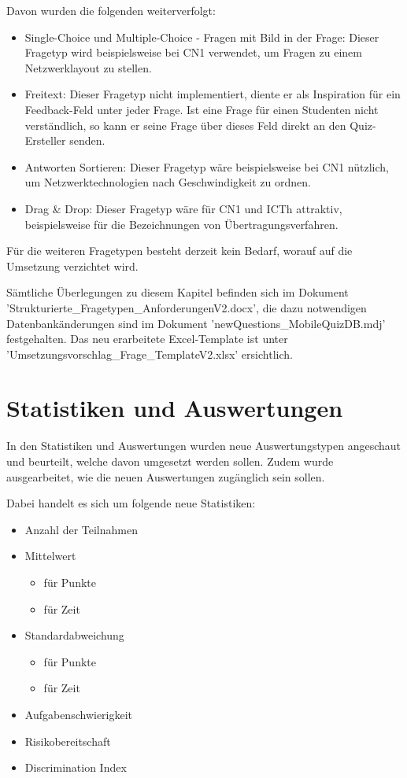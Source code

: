 Davon wurden die folgenden weiterverfolgt:
\begin{itemize}
	\item Single-Choice und Multiple-Choice - Fragen mit Bild in der Frage:
	Dieser Fragetyp wird beispielsweise bei \acrshort{CN1} verwendet, um Fragen zu einem Netzwerklayout zu stellen.
	\item Freitext:
	Dieser Fragetyp nicht implementiert, diente er als Inspiration für ein Feedback-Feld unter jeder Frage. Ist eine Frage für einen Studenten nicht verständlich, so kann er seine Frage über dieses Feld direkt an den Quiz-Ersteller senden.
	\item Antworten Sortieren:
	Dieser Fragetyp wäre beispielsweise bei \acrshort{CN1} nützlich, um Netzwerktechnologien nach Geschwindigkeit zu ordnen.
	\item Drag \& Drop:
	Dieser Fragetyp wäre für \acrshort{CN1} und \acrshort{ICTh} attraktiv, beispielsweise für die Bezeichnungen von Übertragungsverfahren.
\end{itemize}

\noindent Für die weiteren Fragetypen besteht derzeit kein Bedarf, worauf auf die Umsetzung verzichtet wird.

\bigskip

Sämtliche Überlegungen zu diesem Kapitel befinden sich im Dokument \\ 'Strukturierte\_Fragetypen\_AnforderungenV2.docx', die dazu notwendigen Datenbankänderungen sind im Dokument 'newQuestions\_MobileQuizDB.mdj' festgehalten.
Das neu erarbeitete Excel-Template ist unter 'Umsetzungsvorschlag\_Frage\_TemplateV2.xlsx' ersichtlich.

\section{Statistiken und Auswertungen}
In den Statistiken und Auswertungen wurden neue Auswertungstypen angeschaut und beurteilt, welche davon umgesetzt werden sollen. Zudem wurde ausgearbeitet, wie die neuen Auswertungen zugänglich sein sollen.

\bigskip

\noindent Dabei handelt es sich um folgende neue Statistiken:
\begin{itemize}
	\item Anzahl der Teilnahmen
	\item Mittelwert
	\begin{itemize}
		\item für Punkte
		\item für Zeit
	\end{itemize}
	\item Standardabweichung
	\begin{itemize}
		\item für Punkte
		\item für Zeit
	\end{itemize}
	\item Aufgabenschwierigkeit
	\item Risikobereitschaft
	\item Discrimination Index
\end{itemize}


